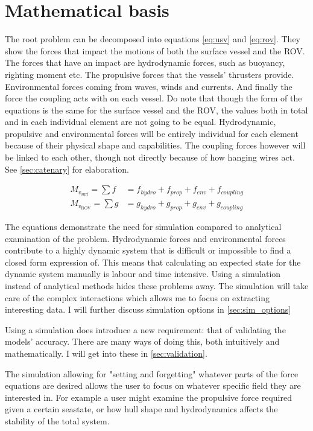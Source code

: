 \section{Mathematical basis}
\label{sec:math}
The root problem can be decomposed into equations \ref{eq:usv} and \ref{eq:rov}. They show the forces that impact the motions of both the surface vessel and the ROV. The forces that have an impact are hydrodynamic forces, such as buoyancy, righting moment etc. The propulsive forces that the vessels' thrusters provide. Environmental forces coming from waves, winds and currents. And finally the force the coupling acts with on each vessel. Do note that though the form of the equations is the same for the surface vessel and the ROV, the values both in total and in each individual element are not going to be equal. Hydrodynamic, propulsive and environmental forces will be entirely individual for each element because of their physical shape and capabilities. The coupling forces however will be linked to each other, though not directly because of how hanging wires act. See \cref{sec:catenary} for elaboration.

\begin{align}
M_{v_{\text{surf}}} = \sum f &= f_{hydro} + f_{prop} + f_{env} + f_ {coupling} \label{eq:usv}\\
M_{v_{\text{ROV}}} = \sum g &= g_{hydro} + g_{prop} + g_{env} + g_ {coupling} \label{eq:rov}
\end{align}

The equations demonstrate the need for simulation compared to analytical examination of the problem. Hydrodynamic forces and environmental forces contribute to a highly dynamic system that is difficult or impossible to find a closed form expression of. This means that calculating an expected state for the dynamic system manually is labour and time intensive. Using a simulation instead of analytical methods hides these problems away. The simulation will take care of the complex interactions which allows me to focus on extracting interesting data. I will further discuss simulation options in \cref{sec:sim_options}

Using a simulation does introduce a new requirement: that of validating the models' accuracy. There are many ways of doing this, both intuitively and mathematically. I will get into these in \cref{sec:validation}. 

The simulation allowing for "setting and forgetting" whatever parts of the force equations are desired allows the user to focus on whatever specific field they are interested in. For example a user might examine the propulsive force required given a certain seastate, or how hull shape and hydrodynamics affects the stability of the total system. 

